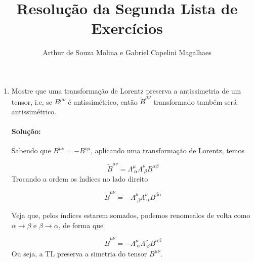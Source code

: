 \documentclass[10pt,a4paper]{article}
\author{Arthur de Souza Molina e Gabriel Capelini Magalhaes}
\title{Resolução da Segunda Lista de Exercícios}
\begin{document}
	\maketitle
	
	\begin{enumerate}
	\item Mostre que uma transformação de Lorentz preserva a antissimetria de um tensor, i.e, se $B^{\mu \nu}$ é antissimétrico, então $\tilde{B}^{\mu \nu}$ transformado também será antissimétrico.
		\paragraph{Solução: } Sabendo que $B^{\mu \nu}=-B^{ \nu \mu}$, aplicando uma transformação de Lorentz, temos 
		
		\begin{equation}
		\tilde{B}^{\mu \nu} = \Lambda^{\mu}_{\;\alpha} \Lambda^{\nu}_{\;\beta}B^{\alpha \beta}
		\end{equation}
		Trocando a ordem os índices no lado direito
		
		\begin{equation}
		\tilde{B}^{\mu \nu} = -\Lambda^{\mu}_{\;\beta} \Lambda^{\nu}_{\;\alpha}B^{\beta \alpha}
		\end{equation}
		
Veja que, pelos índices estarem somados, podemos renomealos  de volta como $\alpha \rightarrow \beta$ e $\beta \rightarrow \alpha$, de forma que 

\begin{equation}
		\tilde{B}^{\mu \nu} = -\Lambda^{\mu}_{\;\alpha} \Lambda^{\nu}_{\;\beta}B^{\alpha \beta}
		\end{equation}
		Ou seja, a TL preserva a simetria do tensor $B^{\mu \nu}$. 
	\end{enumerate}
\end{document}
